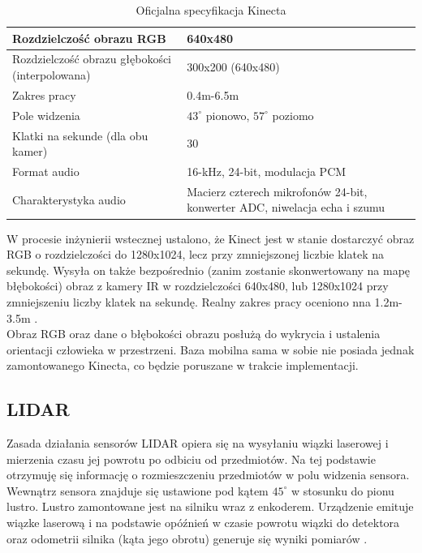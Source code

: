 \begin{table}[h]
\centering
{\renewcommand{\arraystretch}{1.5}
\begin{tabular}{ p{5cm} | p{7cm} }
 Rozdzielczość obrazu RGB & 640x480 \\
 \hline
 Rozdzielczość obrazu głębokości (interpolowana) & 300x200 (640x480) \\
 \hline
 Zakres pracy & 0.4m-6.5m \\
 \hline
 Pole widzenia & $43^{\circ}$ pionowo, $57^{\circ}$ poziomo \\
 \hline
 Klatki na sekunde (dla obu kamer) & 30 \\
 \hline
 Format audio & 16-kHz, 24-bit, modulacja PCM \\
 \hline
 Charakterystyka audio & Macierz czterech mikrofonów 24-bit, konwerter ADC, niwelacja echa i szumu
\end{tabular}}
\caption{Oficjalna specyfikacja Kinecta \cite{kinect}}
\label{tab:kinect_specification}
\end{table}

W procesie inżynierii wstecznej ustalono, że Kinect jest w stanie dostarczyć obraz RGB o rozdzielczości do 1280x1024, lecz przy zmniejszonej liczbie klatek na sekundę. Wysyła on także bezpośrednio (zanim zostanie skonwertowany na mapę błębokości) obraz z kamery IR w rozdzielczości 640x480, lub 1280x1024 przy zmniejszeniu liczby klatek na sekundę. Realny zakres pracy oceniono nna 1.2m-3.5m \cite{kinect_openkinect}. \\

Obraz RGB oraz dane o błębokości obrazu posłużą do wykrycia i ustalenia orientacji człowieka w przestrzeni. Baza mobilna sama w sobie nie posiada jednak zamontowanego Kinecta, co będzie poruszane w trakcie implementacji.\\

\subsection{LIDAR}

Zasada działania sensorów LIDAR opiera się na wysyłaniu wiązki laserowej i mierzenia czasu jej powrotu po odbiciu od przedmiotów. Na tej podstawie otrzymuję się informację o rozmieszczeniu przedmiotów w polu widzenia sensora. Wewnątrz sensora znajduje się ustawione pod kątem $45^{\circ}$ w stosunku do pionu lustro. Lustro zamontowane jest na silniku wraz z enkoderem. Urządzenie emituje wiązke laserową i na podstawie opóźnień w czasie powrotu wiązki do detektora oraz odometrii silnika (kąta jego obrotu) generuje się wyniki pomiarów \cite{lidar}. 


